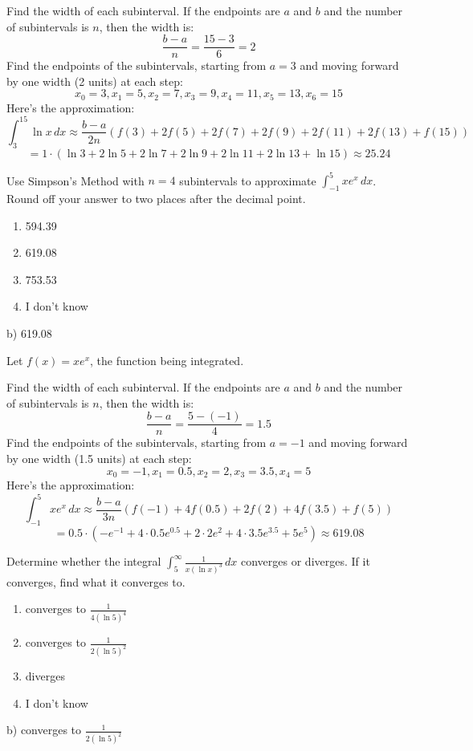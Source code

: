 \documentclass[addpoints,12pt,answers]{exam}
\begin{document}
\begin{questions}
\begin{solution}
    Find the width of each subinterval. If the endpoints are $a$ and $b$ and the number of subintervals is $n$, then the width is:
    $$\frac{b-a}{n}=\frac{15-3}{6}=2$$
    Find the endpoints of the subintervals, starting from $a=3$ and moving forward by one width (2 units) at each step: 
    $$x_0=3, x_1=5, x_2=7, x_3=9, x_4=11, x_5=13, x_6=15$$
    Here's the approximation:
    $$\int_3^{15}\ln x\,dx\approx\frac{b-a}{2n}(f(3)+2f(5)+2f(7)+2f(9)+2f(11)+2f(13)+f(15))$$
    $$=1\cdot(\ln 3+2\ln 5+2\ln 7+2\ln 9+2\ln 11+2\ln 13+\ln 15)\approx 25.24$$
  \end{solution}
  \newpage
  \question
  Use Simpson's Method with $n=4$ subintervals to approximate $\displaystyle\int_{-1}^5 xe^x\,dx$. Round off your answer to two places after the decimal point.
  \begin{enumerate}[label=\alph*)]
    \item
    594.39    
    \item
    619.08
    \item
    753.53
    \item
    I don't know
  \end{enumerate}
  \begin{solution}
    b) 619.08
    
    Let $f(x)=xe^x$, the function being integrated.
    
    Find the width of each subinterval. If the endpoints are $a$ and $b$ and the number of subintervals is $n$, then the width is:
    $$\frac{b-a}{n}=\frac{5-(-1)}{4}=1.5$$
    Find the endpoints of the subintervals, starting from $a=-1$ and moving forward by one width (1.5 units) at each step: 
    $$x_0=-1, x_1=0.5, x_2=2, x_3=3.5, x_4=5$$
    Here's the approximation:
    $$\int_{-1}^5 xe^x\,dx\approx\frac{b-a}{3n}(f(-1)+4f(0.5)+2f(2)+4f(3.5)+f(5))$$
    $$=0.5\cdot\left(-e^{-1}+4\cdot 0.5e^{0.5}+2\cdot 2e^2+4\cdot 3.5e^{3.5}+5e^5\right)\approx 619.08$$
  \end{solution}
  \newpage
  \question
  Determine whether the integral $\displaystyle\int_5^\infty\frac{1}{x(\ln x)^3}\,dx$ converges or diverges. If it converges, find what it converges to.
  \begin{enumerate}[label=\alph*)]
    \item
    converges to $\displaystyle\frac{1}{4(\ln 5)^4}$
    \item
    converges to $\displaystyle\frac{1}{2(\ln 5)^2}$
    \item
    diverges
    \item
    I don't know
  \end{enumerate}
  \begin{solution}
    b) converges to $\displaystyle\frac{1}{2(\ln 5)^2}$
    

\end{solution}
\end{questions}
\end{document}
